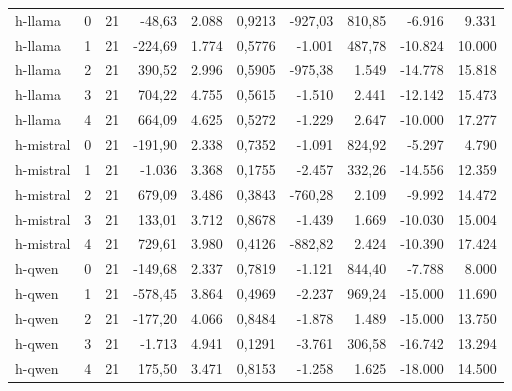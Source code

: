 \begin{landscape}
\begin{longtable}{lrrrrrrrrr}
h-llama & 0 & 21 & -48,63 & 2.088 & 0,9213 & -927,03 & 810,85 & -6.916 & 9.331 \\
h-llama & 1 & 21 & -224,69 & 1.774 & 0,5776 & -1.001 & 487,78 & -10.824 & 10.000 \\
h-llama & 2 & 21 & 390,52 & 2.996 & 0,5905 & -975,38 & 1.549 & -14.778 & 15.818 \\
h-llama & 3 & 21 & 704,22 & 4.755 & 0,5615 & -1.510 & 2.441 & -12.142 & 15.473 \\
h-llama & 4 & 21 & 664,09 & 4.625 & 0,5272 & -1.229 & 2.647 & -10.000 & 17.277 \\
h-mistral & 0 & 21 & -191,90 & 2.338 & 0,7352 & -1.091 & 824,92 & -5.297 & 4.790 \\
h-mistral & 1 & 21 & -1.036 & 3.368 & 0,1755 & -2.457 & 332,26 & -14.556 & 12.359 \\
h-mistral & 2 & 21 & 679,09 & 3.486 & 0,3843 & -760,28 & 2.109 & -9.992 & 14.472 \\
h-mistral & 3 & 21 & 133,01 & 3.712 & 0,8678 & -1.439 & 1.669 & -10.030 & 15.004 \\
h-mistral & 4 & 21 & 729,61 & 3.980 & 0,4126 & -882,82 & 2.424 & -10.390 & 17.424 \\
h-qwen & 0 & 21 & -149,68 & 2.337 & 0,7819 & -1.121 & 844,40 & -7.788 & 8.000 \\
h-qwen & 1 & 21 & -578,45 & 3.864 & 0,4969 & -2.237 & 969,24 & -15.000 & 11.690 \\
h-qwen & 2 & 21 & -177,20 & 4.066 & 0,8484 & -1.878 & 1.489 & -15.000 & 13.750 \\
h-qwen & 3 & 21 & -1.713 & 4.941 & 0,1291 & -3.761 & 306,58 & -16.742 & 13.294 \\
h-qwen & 4 & 21 & 175,50 & 3.471 & 0,8153 & -1.258 & 1.625 & -18.000 & 14.500 \\
\end{longtable}
\end{landscape}
